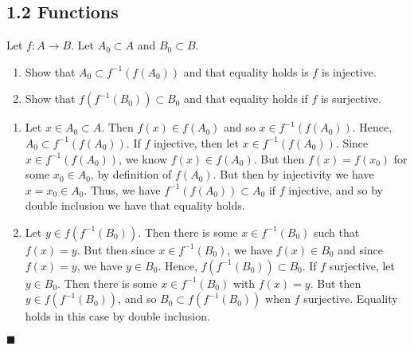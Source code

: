 \documentclass[12pt]{article}
\renewcommand{\qed}{\hfill$\blacksquare$}
\renewenvironment{proof}{\begin{addmargin}[1em]{0em}\begin{newproof}}{\end{newproof}\end{addmargin}\qed}
\newenvironment{problem}[2][Exercise]{\begin{trivlist}
\item[\hskip \labelsep {\bfseries #1}\hskip \labelsep {\bfseries #2.}]}{\end{trivlist}}
\begin{document}
\subsection*{1.2 Functions}

\begin{problem}{1.2.1}
Let $f:A\rightarrow B$. Let $A_0 \subset A$ and $B_0 \subset B$.
\begin{enumerate}[label=(\alph*)]
	\item Show that $A_0 \subset f^{-1}\left(f\left(A_0\right)\right)$ and that equality holds is $f$ is injective.
	\item Show that $f\left(f^{-1}\left(B_0\right)\right) \subset B_0$ and that equality holds if $f$ is surjective.
\end{enumerate}
\end{problem}
\begin{proof}
\begin{enumerate}[label=(\alph*)]
	\item Let $x\in A_0 \subset A$. Then $f\left(x\right) \in f\left(A_0\right)$ and so $x \in f^{-1}\left(f\left(A_0\right)\right)$. Hence, $A_0 \subset f^{-1}\left(f\left(A_0\right)\right)$. If $f$ injective, then let $x \in f^{-1}\left(f\left(A_0\right)\right)$. Since $x \in f^{-1}\left(f\left(A_0\right)\right)$, we know $f\left(x\right) \in f\left(A_0\right)$. But then $f\left(x\right) = f\left(x_0\right)$ for some $x_0 \in A_0$, by definition of $f\left(A_0\right)$. But then by injectivity we have $x = x_0 \in A_0$. Thus, we have $f^{-1}\left(f\left(A_0\right)\right) \subset A_0$ if $f$ injective, and so by double inclusion we have that equality holds.
	\item Let $y \in f\left(f^{-1}\left(B_0\right)\right)$. Then there is some $x\in f^{-1}\left(B_0\right)$ such that $f\left(x\right)=y$. But then since $x\in f^{-1}\left(B_0\right)$, we have $f\left(x\right) \in B_0$ and since $f\left(x\right)=y$, we have $y \in B_0$. Hence, $f\left(f^{-1}\left(B_0\right)\right) \subset B_0$. If $f$ surjective, let $y \in B_0$. Then there is some $x \in f^{-1}\left(B_0\right)$ with $f\left(x\right)=y$. But then $y \in f\left(f^{-1}\left(B_0\right)\right)$, and so $B_0 \subset f\left(f^{-1}\left(B_0\right)\right)$ when $f$ surjective. Equality holds in this case by double inclusion.
\end{enumerate}
\end{proof}
\end{document}
